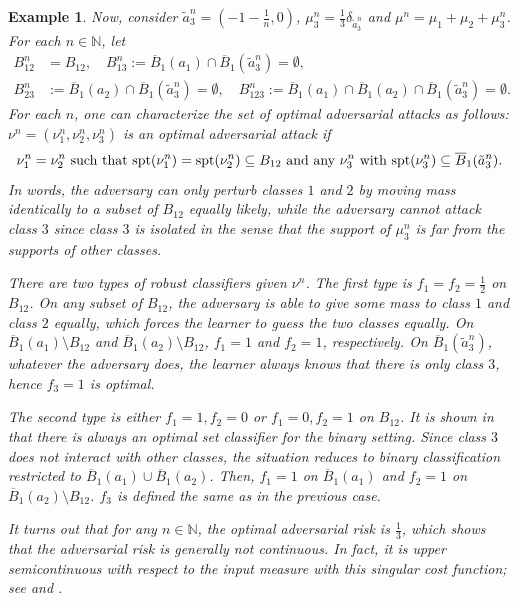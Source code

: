 \documentclass{amsart}
\theoremstyle{plain}
\numberwithin{equation}{section}\newtheorem{theorem}{Theorem}[section]
\newtheorem{example}[theorem]{Example}
\theoremstyle{remark}
\newcommand{\spt}{\textup{spt}}
\begin{document}
\begin{example}
Now, consider $\tilde{a}^n_3 =(-1 - \frac{1}{n}, 0)$, $\mu_3^n = \frac{1}{3} \delta_{\tilde{a}^n_3}$ and $\mu^n = \mu_1 + \mu_2 + \mu_3^n$. For each $n \in \mathbb{N}$, let
\begin{align*}
    B^n_{12} &= B_{12}, \quad B^n_{13}:=\overline{B}_1(a_1) \cap \overline{B}_1(\tilde{a}^n_3) = \emptyset,\\
    B^n_{23}&:=\overline{B}_1(a_2) \cap \overline{B}_1(\tilde{a}^n_3) = \emptyset, \quad B^n_{123}:=%
    \overline{B}_1(a_1) \cap \overline{B}_1(a_2) \cap \overline{B}_1(\tilde{a}^n_3) = \emptyset.
\end{align*}
For each $n$, one can characterize the set of optimal adversarial attacks as follows: $\nu^n = (\nu_1^n, \nu_2^n, \nu_3^n)$ is an optimal adversarial attack if
\[
    \nu_1^n=\nu_2^n \text{ such that $\spt(\nu_1^n)=\spt(\nu_2^n) \subseteq B_{12}$ and any } \nu_3^n \text{ with $\spt(\nu_3^n) \subseteq \overline{B}_1(\tilde{a}^n_3)$}.
\]
In words, the adversary can only perturb classes $1$ and $2$ by moving mass identically to a subset of $B_{12}$ equally likely, while the adversary cannot attack class $3$ since class $3$ is isolated in the sense that the support of $\mu_3^n$ is far from the supports of other classes.




There are two types of robust classifiers given $\nu^n$. The first type is $f_1=f_2=\frac{1}{2}$ on $B_{12}$. On any subset of $B_{12}$, the adversary is able to give some mass to class $1$ and class $2$ equally, which forces the learner to guess the two classes equally. On $\overline{B}_1(a_1) \setminus B_{12}$ and $\overline{B}_1(a_2) \setminus B_{12}$, $f_1=1$ and $f_2=1$, respectively. On $\overline{B}_1(\tilde{a}^n_3)$, whatever the adversary does, the learner always knows that there is only class $3$, hence $f_3=1$ is optimal. 



The second type is either $f_1=1, f_2=0$ or $f_1=0, f_2=1$ on $B_{12}$. It is shown in \cite{bungert2023geometry} that there is always an optimal set classifier for the binary setting. Since class $3$ does not interact with other classes, the situation reduces to binary classification restricted to $\overline{B}_1(a_1) \cup \overline{B}_1(a_2)$. Then, $f_1=1$ on $\overline{B}_1(a_1)$ and $f_2=1$ on $\overline{B}_1(a_2) \setminus B_{12}$. $f_3$ is defined the same as in the previous case.




It turns out that for any $n \in \mathbb{N}$, the optimal adversarial risk is $\frac{1}{3}$, which shows that the adversarial risk is generally not continuous. In fact, it is upper semicontinuous with respect to the input measure with this singular cost function; see  and . 




\end{example}
\end{document}
